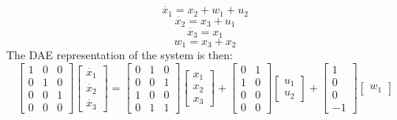 \begin{equation}
\dot{x_1}=x_2+w_1+u_2
\end{equation}
\begin{equation}
\dot{x_2}=x_3+u_1
\end{equation}
\begin{equation}
\dot{x_3}=x_1
\end{equation}
\begin{equation}
w_1=x_3+x_2
\end{equation}The DAE representation of the system is then:
\begin{equation}
\begin{bmatrix}  1 & 0 & 0 \\ 0 & 1 & 0  \\ 0 & 0 & 1 \\ 0 & 0 & 0   \end{bmatrix}  \left[ \begin{array}{c} \dot{x_1} \\ \dot{x_2} \\ \dot{x_3} \end{array} \right]
= \begin{bmatrix} 0 & 1 & 0 \\ 0 & 0 & 1 \\ 1 & 0 & 0 \\ 0 & 1 & 1 \end{bmatrix}  \left[ \begin{array}{c} x_1 \\ x_2 \\ x_3 \end{array} \right] + \begin{bmatrix} 0 & 1 \\ 1 & 0 \\ 0 & 0 \\ 0 & 0 \end{bmatrix} \left[ \begin{array}{c} u_1 \\ u_2 \end{array} \right]+
\begin{bmatrix} 1 \\ 0 \\ 0  \\ -1 \end{bmatrix} \left[ \begin{array}{c} w_1 \end{array} \right]
\label{fig:eqDAE}
\end{equation}
%
